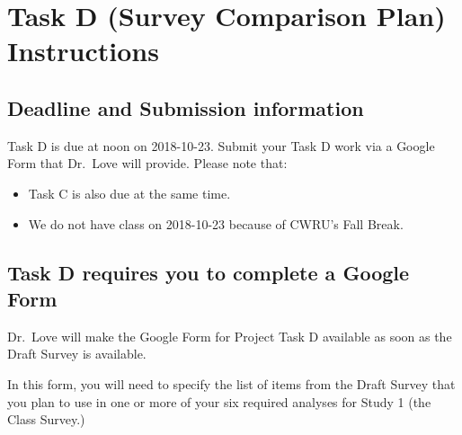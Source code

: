 \documentclass[]{book}
\providecommand{\tightlist}{%
  \setlength{\itemsep}{0pt}\setlength{\parskip}{0pt}}
\theoremstyle{definition}
\theoremstyle{definition}
\theoremstyle{definition}
\theoremstyle{remark}
\begin{document}
\hypertarget{taskD}{%
\chapter{Task D (Survey Comparison Plan) Instructions}\label{taskD}}

\hypertarget{deadline-and-submission-information-3}{%
\section{Deadline and Submission
information}\label{deadline-and-submission-information-3}}

Task D is due at noon on 2018-10-23. Submit your Task D work via a
Google Form that Dr.~Love will provide. Please note that:

\begin{itemize}
\tightlist
\item
  Task C is also due at the same time.
\item
  We do not have class on 2018-10-23 because of CWRU's Fall Break.
\end{itemize}

\hypertarget{task-d-requires-you-to-complete-a-google-form}{%
\section{Task D requires you to complete a Google
Form}\label{task-d-requires-you-to-complete-a-google-form}}

Dr.~Love will make the Google Form for Project Task D available as soon
as the Draft Survey is available.

In this form, you will need to specify the list of items from the Draft
Survey that you plan to use in one or more of your six required analyses
for Study 1 (the Class Survey.)
\end{document}
